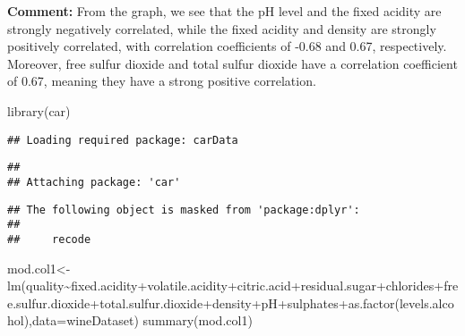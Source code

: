 \documentclass[
]{article}
\newenvironment{Shaded}{\begin{snugshade}}{\end{snugshade}}
\newcommand{\AttributeTok}[1]{\textcolor[rgb]{0.77,0.63,0.00}{#1}}
\newcommand{\FunctionTok}[1]{\textcolor[rgb]{0.00,0.00,0.00}{#1}}
\newcommand{\NormalTok}[1]{#1}
\newcommand{\OtherTok}[1]{\textcolor[rgb]{0.56,0.35,0.01}{#1}}
\newcommand{\SpecialCharTok}[1]{\textcolor[rgb]{0.00,0.00,0.00}{#1}}
\begin{document}
\textbf{Comment:} From the graph, we see that the pH level and the fixed
acidity are strongly negatively correlated, while the fixed acidity and
density are strongly positively correlated, with correlation
coefficients of -0.68 and 0.67, respectively. Moreover, free sulfur
dioxide and total sulfur dioxide have a correlation coefficient of 0.67,
meaning they have a strong positive correlation.

\begin{Shaded}
\begin{Highlighting}[]
\FunctionTok{library}\NormalTok{(car)}
\end{Highlighting}
\end{Shaded}

\begin{verbatim}
## Loading required package: carData
\end{verbatim}

\begin{verbatim}
## 
## Attaching package: 'car'
\end{verbatim}

\begin{verbatim}
## The following object is masked from 'package:dplyr':
## 
##     recode
\end{verbatim}

\begin{Shaded}
\begin{Highlighting}[]
\NormalTok{mod.col1}\OtherTok{\textless{}{-}}\FunctionTok{lm}\NormalTok{(quality}\SpecialCharTok{\textasciitilde{}}\NormalTok{fixed.acidity}\SpecialCharTok{+}\NormalTok{volatile.acidity}\SpecialCharTok{+}\NormalTok{citric.acid}\SpecialCharTok{+}\NormalTok{residual.sugar}\SpecialCharTok{+}\NormalTok{chlorides}\SpecialCharTok{+}\NormalTok{free.sulfur.dioxide}\SpecialCharTok{+}\NormalTok{total.sulfur.dioxide}\SpecialCharTok{+}\NormalTok{density}\SpecialCharTok{+}\NormalTok{pH}\SpecialCharTok{+}\NormalTok{sulphates}\SpecialCharTok{+}\FunctionTok{as.factor}\NormalTok{(levels.alcohol),}\AttributeTok{data=}\NormalTok{wineDataset)}
\FunctionTok{summary}\NormalTok{(mod.col1)}
\end{Highlighting}
\end{Shaded}
\end{document}
